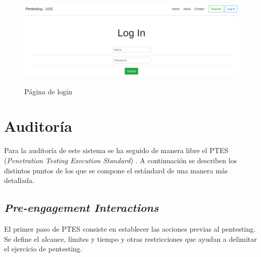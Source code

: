 \documentclass[a4paper,oneside]{article}
\begin{document}
\begin{figure}[h!]
  \centering
  \includegraphics[scale=0.4]{images/login.png}\\
  \caption{Página de login}
  \label{fig:login}
\end{figure}

\newpage

\section{Auditoría}
Para la auditoría de este sistema se ha seguido de manera libre el PTES (\textit{Penetration Testing Execution Standard}) \cite{ptes}. A continuación se describen los distintos puntos de los que se compone el estándard de una manera más detallada.

\subsection{\textit{Pre-engagement Interactions}}
El primer paso de PTES consiste en establecer las acciones previas al pentesting. Se define el alcance, límites y tiempo y otras restricciones que ayudan a delimitar el ejercicio de pentesting.\\
\end{document}
